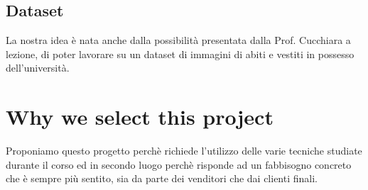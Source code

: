 \documentclass[10pt]{article}
\begin{document}
\subsection{Dataset}
La nostra idea è nata anche dalla possibilità presentata dalla Prof. Cucchiara a lezione, di poter lavorare su un dataset di immagini di abiti e vestiti in possesso dell'università. 
\\ [4ex]

\section{Why we select this project}
Proponiamo questo progetto perchè richiede l'utilizzo delle varie tecniche studiate durante il corso 
ed in secondo luogo perchè risponde ad un fabbisogno concreto che è sempre più sentito, sia da parte dei venditori che dai clienti finali.
\end{document}
